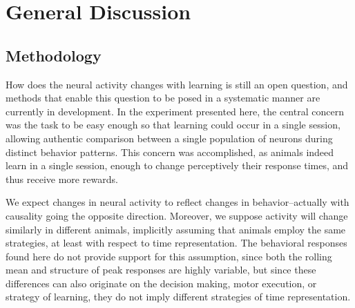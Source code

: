 


\chapter{General Discussion}
\label{chap:results}

\section{Methodology}
How does the neural activity changes with learning is still an open question, and methods that enable this question to be posed in a systematic manner are currently in development. In the experiment presented here, the central concern was the task to be easy enough so that learning could occur in a single session, allowing authentic comparison between a single population of neurons during distinct behavior patterns. This concern was accomplished, as animals indeed learn in a single session, enough to change perceptively their response times, and thus receive more rewards. 

We expect changes in neural activity to reflect changes in behavior--actually with causality going the opposite direction. Moreover, we suppose activity will change similarly in different animals, implicitly assuming that animals employ the same strategies, at least with respect to time representation. The behavioral responses found here do not provide support for this assumption, since both the rolling mean and structure of peak responses are highly variable, but since these differences can also originate on the decision making, motor execution, or strategy of learning, they do not imply different strategies of time representation.

